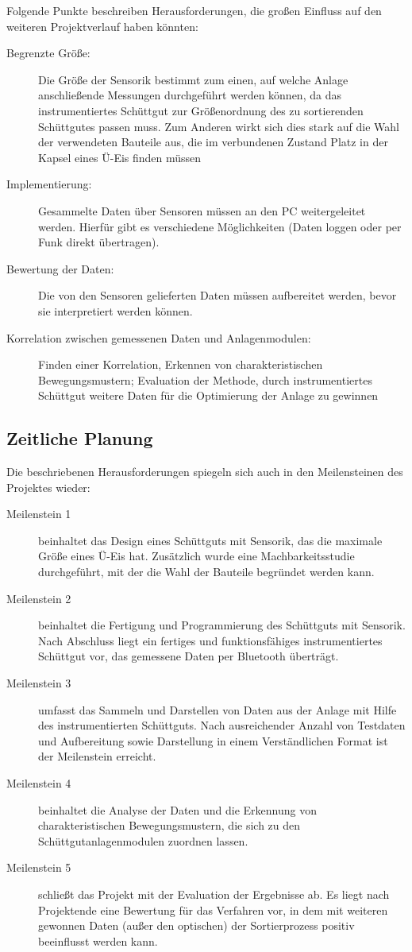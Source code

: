 Folgende Punkte beschreiben Herausforderungen, die großen Einfluss auf den weiteren Projektverlauf haben könnten:
\begin{description}
	\item [Begrenzte Größe:] Die Größe der Sensorik bestimmt zum einen, auf welche Anlage anschließende Messungen durchgeführt werden können, da das instrumentiertes Schüttgut zur Größenordnung des zu sortierenden Schüttgutes passen muss. Zum Anderen wirkt sich dies stark auf die Wahl der verwendeten Bauteile aus, die im verbundenen Zustand Platz in der Kapsel eines Ü-Eis finden müssen
	\item [Implementierung:] Gesammelte Daten über Sensoren müssen an den PC weitergeleitet werden. Hierfür gibt es verschiedene Möglichkeiten (Daten loggen oder per Funk direkt übertragen).
	\item [Bewertung der Daten:] Die von den Sensoren gelieferten Daten müssen aufbereitet werden, bevor sie interpretiert werden können.
	\item [Korrelation zwischen gemessenen Daten und Anlagenmodulen:] Finden einer Korrelation, Erkennen von charakteristischen Bewegungsmustern; Evaluation der Methode, durch instrumentiertes Schüttgut weitere Daten für die Optimierung der Anlage zu gewinnen 
\end{description} 

\subsection{Zeitliche Planung}
Die beschriebenen Herausforderungen spiegeln sich auch in den Meilensteinen des Projektes wieder:
\begin{description}
	\item [Meilenstein 1] beinhaltet das Design eines Schüttguts mit Sensorik, das die maximale Größe eines Ü-Eis hat. Zusätzlich wurde eine Machbarkeitsstudie durchgeführt, mit der die Wahl der Bauteile begründet werden kann.
	\item [Meilenstein 2] beinhaltet die Fertigung und Programmierung des Schüttguts mit Sensorik. Nach Abschluss liegt ein fertiges und funktionsfähiges instrumentiertes Schüttgut vor, das gemessene Daten per Bluetooth überträgt.
	\item [Meilenstein 3] umfasst das Sammeln und Darstellen von Daten aus der Anlage mit Hilfe des instrumentierten Schüttguts. Nach ausreichender Anzahl von Testdaten und Aufbereitung sowie Darstellung in einem Verständlichen Format ist der Meilenstein erreicht.
	\item [Meilenstein 4] beinhaltet die Analyse der Daten und die Erkennung von charakteristischen Bewegungsmustern, die sich zu den Schüttgutanlagenmodulen zuordnen lassen.
	\item [Meilenstein 5] schließt das Projekt mit der Evaluation der Ergebnisse ab. Es liegt nach Projektende eine Bewertung für das Verfahren vor, in dem mit  weiteren gewonnen Daten (außer den optischen) der Sortierprozess positiv beeinflusst werden kann.
\end{description}
	
